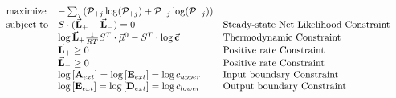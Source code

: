 \[
\begin{array}{llll}
  &  \text{maximize}  &  - \sum_j\left(\mathcal P_{+j}\log(\mathcal P_{+j}) +  \mathcal P_{-j}\log(\mathcal P_{-j})\right) &   \\
   & \text{subject to}  & S\cdot(\vec{\bf L}_+-\vec{\bf L}_-) = 0  &  \text{Steady-state Net Likelihood Constraint} \\
     &                  &\log\vec{\bf L}_+\frac{1}{RT}S^T\cdot\vec{\mu}^0 - S^T\cdot\log\vec{\bf c} & \text{Thermodynamic Constraint} \\
      &                   & \vec{\bf L}_+ \geq 0 & \text{Positive rate Constraint} \\
       &                  & \vec{\bf L}_- \geq 0 & \text{Positive rate Constraint} \\
        &              & \log \left[{\bf A}_{ext}\right] = \log \left[{\bf E}_{ext}\right] =  \log c_{upper} & \text{Input boundary Constraint} \\
       &               & \log \left[{\bf E}_{ext}\right] = \log \left[{\bf D}_{ext}\right] = \log c_{lower}  & \text{Output boundary Constraint} \\         
\end{array}\]